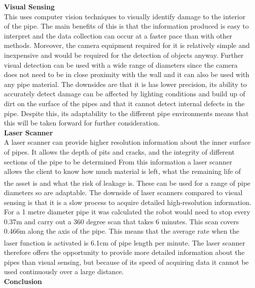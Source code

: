 \documentclass[11pt]{article}		%
\newcommand{\supercite}[1]{\textsuperscript{\cite{#1}}}		%
\begin{document}
			
			\textbf{Visual Sensing}
			\\
	        This uses computer vision techniques to visually identify damage to the interior of the pipe. The main benefits of this is that the information produced is easy to interpret and the data collection can occur at a faster pace than with other methods. Moreover, the camera equipment required for it is relatively simple and inexpensive and would be required for the detection of objects anyway. Further visual detection can be used with a wide range of diameters since the camera does not need to be in close proximity with the wall and it can also be used with any pipe material. The downsides are that it is has lower precision, its ability to accurately detect damage can be affected by lighting conditions and build up of dirt on the surface of the pipes and that it cannot detect internal defects in the pipe. Despite this, its adaptability to the different pipe environments means that this will be taken forward for further consideration. 
	        \\
	        \textbf{Laser Scanner}
	        \\
	   A laser scanner can provide higher resolution information about the inner surface of pipes. It allows the depth of pits and cracks, and the integrity of different sections of the pipe to be determined From this information a laser scanner allows the client to know how much material is left, what the remaining life of the asset is and what the risk of leakage is.\supercite{2g_robotics} These can be used for a range of pipe diameters so are adaptable. The downside of laser scanners compared to visual sensing is that it is a slow process to acquire detailed high-resolution information. For a 1 metre diameter pipe it was calculated the robot would need to stop every 0.37m and carry out a 360 degree scan that takes 6 minutes. This scan covers 0.466m along the axis of the pipe. This means that the average rate when the laser function is activated is 6.1cm of pipe length per minute.\supercite{2g_robotics} The laser scanner therefore offers the opportunity to provide more detailed information about the pipes than visual sensing, but because of its speed of acquiring data it cannot be used continuously over a large distance.
	        \\
	        \textbf{Conclusion}
	        \\
	 
\end{document}
